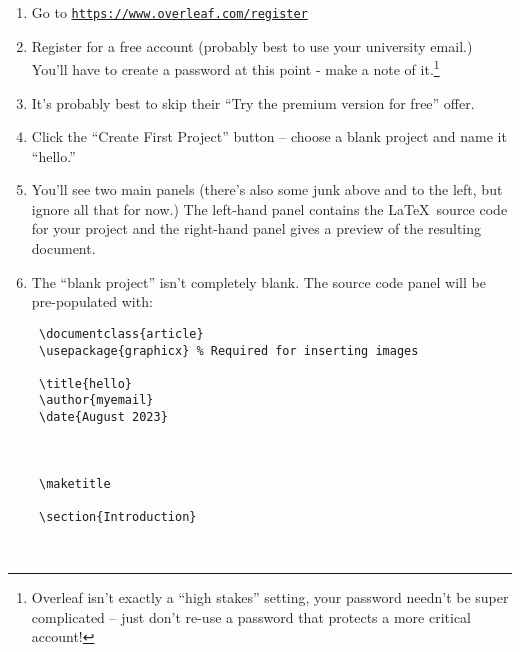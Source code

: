 \begin{enumerate}
	\item Go to \href{https://www.overleaf.com/register}{\tt https://www.overleaf.com/register}
	\item Register for a free account (probably best to use your university email.)  You'll have to create a password at this point - make a note of it.\footnote{Overleaf isn't exactly a ``high stakes'' setting, your password needn't be super complicated -- just don't re-use a password that protects a more critical account!}
	\item It's probably best to skip their ``Try the premium version for free'' offer.
    \item Click the ``Create First Project'' button -- choose a blank project and name it ``hello.''
    \item You'll see two main panels (there's also some junk above and to the left, but ignore all that for now.)  The left-hand panel contains the \LaTeX\ source code for your project and the right-hand panel gives a preview of the resulting document.
    \item The ``blank project'' isn't completely blank.  The source code panel will be pre-populated with:
\medskip

\begin{codeblock}
\begin{verbatim}
 \documentclass{article}
 \usepackage{graphicx} % Required for inserting images

 \title{hello}
 \author{myemail}
 \date{August 2023}

 

 \maketitle

 \section{Introduction}

 
\end{verbatim}
\end{codeblock}

\clearpage


\end{enumerate}

